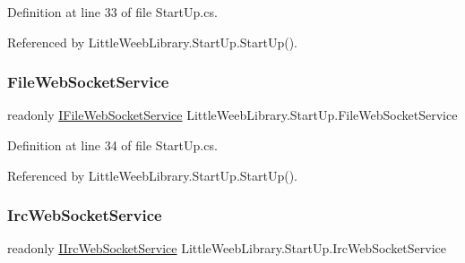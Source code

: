Definition at line 33 of file Start\+Up.\+cs.



Referenced by Little\+Weeb\+Library.\+Start\+Up.\+Start\+Up().

\mbox{\label{class_little_weeb_library_1_1_start_up_a5e64330715e64985065209ba09a5740d}} 
\subsubsection{\texorpdfstring{File\+Web\+Socket\+Service}{FileWebSocketService}}
{\footnotesize\ttfamily readonly \mbox{\hyperlink{interface_little_weeb_library_1_1_services_1_1_i_file_web_socket_service}{I\+File\+Web\+Socket\+Service}} Little\+Weeb\+Library.\+Start\+Up.\+File\+Web\+Socket\+Service\hspace{0.3cm}{\ttfamily [private]}}



Definition at line 34 of file Start\+Up.\+cs.



Referenced by Little\+Weeb\+Library.\+Start\+Up.\+Start\+Up().

\mbox{\label{class_little_weeb_library_1_1_start_up_a5f3d87069480ab499770d8aed9b20a40}} 
\subsubsection{\texorpdfstring{Irc\+Web\+Socket\+Service}{IrcWebSocketService}}
{\footnotesize\ttfamily readonly \mbox{\hyperlink{interface_little_weeb_library_1_1_services_1_1_i_irc_web_socket_service}{I\+Irc\+Web\+Socket\+Service}} Little\+Weeb\+Library.\+Start\+Up.\+Irc\+Web\+Socket\+Service\hspace{0.3cm}{\ttfamily [private]}}



